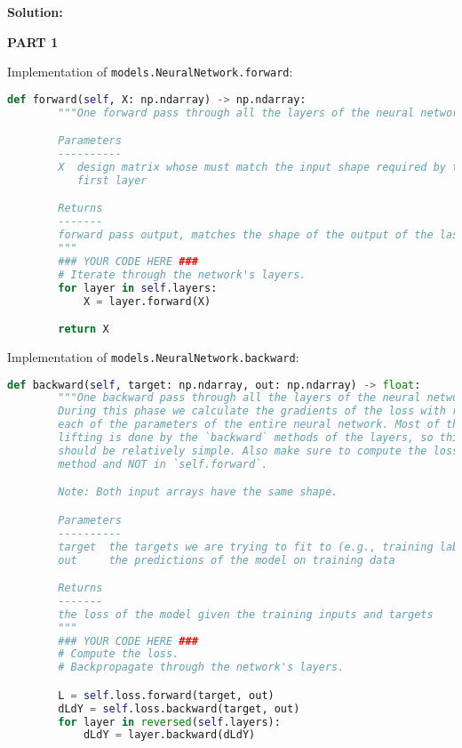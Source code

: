 \documentclass{article}
\newenvironment{solution}{\color{blue} \smallskip \textbf{Solution:}}{}
\begin{document}
\begin{solution}

\textbf{PART 1}

Implementation of \texttt{models.NeuralNetwork.forward}:

\begin{lstlisting}[language=Python]
    def forward(self, X: np.ndarray) -> np.ndarray:
        """One forward pass through all the layers of the neural network.

        Parameters
        ----------
        X  design matrix whose must match the input shape required by the
           first layer

        Returns
        -------
        forward pass output, matches the shape of the output of the last layer
        """
        ### YOUR CODE HERE ###
        # Iterate through the network's layers.
        for layer in self.layers:
            X = layer.forward(X)

        return X

\end{lstlisting}

Implementation of \texttt{models.NeuralNetwork.backward}:

\begin{lstlisting}[language=Python]
    def backward(self, target: np.ndarray, out: np.ndarray) -> float:
        """One backward pass through all the layers of the neural network.
        During this phase we calculate the gradients of the loss with respect to
        each of the parameters of the entire neural network. Most of the heavy
        lifting is done by the `backward` methods of the layers, so this method
        should be relatively simple. Also make sure to compute the loss in this
        method and NOT in `self.forward`.

        Note: Both input arrays have the same shape.

        Parameters
        ----------
        target  the targets we are trying to fit to (e.g., training labels)
        out     the predictions of the model on training data

        Returns
        -------
        the loss of the model given the training inputs and targets
        """
        ### YOUR CODE HERE ###
        # Compute the loss.
        # Backpropagate through the network's layers.

        L = self.loss.forward(target, out)
        dLdY = self.loss.backward(target, out)
        for layer in reversed(self.layers):
            dLdY = layer.backward(dLdY)


\end{lstlisting}
\end{solution}
\end{document}
